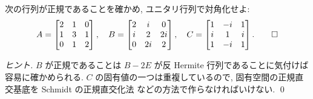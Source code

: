 \documentclass[12pt,twoside]{jarticle}
\begin{document}
\begin{question}[15点]
  次の行列が正規であることを確かめ, ユニタリ行列で対角化せよ:
  \begin{equation*}
    A =
    \begin{bmatrix}
      2 & 1 & 0 \\
      1 & 3 & 1 \\
      0 & 1 & 2 \\
    \end{bmatrix},
    \quad
    B =
    \begin{bmatrix}
      2 & i  & 0 \\
      i & 2  & 2i \\
      0 & 2i & 2 \\
    \end{bmatrix},
    \quad
    C =
    \begin{bmatrix}
      1 & -i & 1 \\
      i &  1 & i \\
      1 & -i & 1 \\
    \end{bmatrix}.
    \qed
  \end{equation*}
\end{question}

\begin{proof}[ヒント]
  $B$ が正規であることは $B-2E$ が反 Hermite 行列であることに気付けば
  容易に確かめられる. 
  $C$ の固有値の一つは重複しているので, 
  固有空間の正規直交基底を Schmidt の正規直交化法
  などの方法で作らなければいけない.
  \qed
\end{proof}
\end{document}
